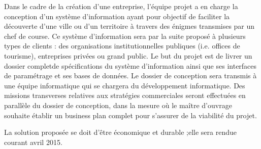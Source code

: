 Dans le cadre de la création d’une entreprise,  l’équipe projet a en charge la conception d’un système d’information ayant pour objectif de faciliter la découverte d’une ville ou d’un territoire à travers des énigmes transmises par un chef de course.
Ce système d’information sera par la suite proposé à plusieurs types de clients : des organisations institutionnelles publiques (i.e. offices de tourisme), entreprises privées ou grand public.
Le but du projet est de livrer un dossier completde spécifications du système d’information ainsi que ses interfaces de paramétrage et ses bases de données. Le dossier de conception sera transmis à une équipe informatique qui se chargera du développement informatique. 
Des missions transverses relatives aux stratégies commerciales seront effectuées en parallèle du dossier de conception, dans la mesure où le maître d’ouvrage souhaite établir un business plan complet pour s’assurer de la viabilité du projet.

La solution proposée se doit d’être économique et durable ;elle sera rendue courant avril 2015.
